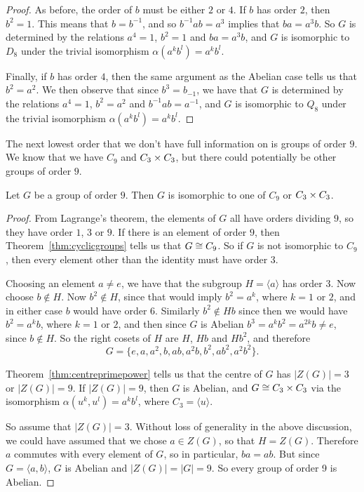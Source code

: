 \begin{proof}
  As before, the order of $b$ must be either $2$ or $4$.  If $b$ has order $2$,
  then $b^{2} = 1$.  This means that $b = b^{-1}$, and so $b^{-1}ab = a^{3}$
  implies that $ba = a^{3}b$. So $G$ is determined by the relations
  $a^{4} = 1$, $b^{2} = 1$ and $ba = a^{3}b$, and $G$ is isomorphic to $D_{8}$
  under the trivial isomorphism $\alpha(a^{k}b^{l}) = a^{k}b^{l}$.
  
  Finally, if $b$ has order $4$, then the same argument as the Abelian case
  tells us that $b^{2} = a^{2}$.  We then observe that since $b^{3} = b_{-1}$,
  we have that $G$ is determined by the relations $a^{4} = 1$, $b^{2} = a^{2}$
  and $b^{-1}ab = a^{-1}$, and $G$ is isomorphic to $Q_{8}$
  under the trivial isomorphism $\alpha(a^{k}b^{l}) = a^{k}b^{l}$.
\end{proof}

The next lowest order that we don't have full information on is groups of
order $9$.  We know that we have $C_{9}$ and $C_{3} \times C_{3}$, but there
could potentially be other groups of order $9$.

\begin{theorem}\label{thm:groupsoforder9}
  Let $G$ be a group of order $9$.  Then $G$ is isomorphic to one of $C_{9}$
  or $C_{3} \times C_{3}$.
\end{theorem}
\begin{proof}
  From Lagrange's theorem, the elements of $G$ all have orders dividing $9$,
  so they have order $1$, $3$ or $9$.  If there is an element of order $9$,
  then Theorem~\ref{thm:cyclicgroups} tells us that $G \cong C_{9}$.  So if
  $G$ is not isomorphic to $C_{9}$, then every
  element other than the identity must have order $3$.
  
  Choosing an element $a \ne e$, we have that the subgroup $H = \langle
  a \rangle$ has order $3$.  Now choose $b \not\in H$.  Now $b^{2} \not\in H$,
  since that would imply $b^{2} = a^{k}$, where $k = 1$ or $2$, and in either
  case $b$ would have order $6$.  Similarly $b^{2} \notin Hb$ since then we
  would have $b^{2} = a^{k}b$, where $k = 1$ or $2$, and then since $G$ is
  Abelian $b^{3} = a^{k}b^{2} = a^{2k}b \ne e$, since $b \notin H$.  So the
  right cosets of $H$ are $H$, $Hb$ and $Hb^{2}$, and therefore
  \[
    G = \{e, a, a^{2}, b, ab, a^{2}b, b^{2}, ab^{2}, a^{2}b^{2}\}.
  \]

  Theorem~\ref{thm:centreprimepower} tells us that the centre of $G$ has
  $|Z(G)| = 3$ or $|Z(G)| = 9$.  If $|Z(G)| = 9$, then $G$ is Abelian, and
  $G \cong C_{3} \times C_{3}$ via the isomorphism $\alpha(u^{k}, u^{l}) =
  a^{k}b^{l}$, where $C_{3} = \langle u \rangle$.
  
  So assume that $|Z(G)| = 3$.  Without loss of generality in the above
  discussion, we could have assumed that we chose $a \in Z(G)$, so that
  $H = Z(G)$.  Therefore $a$ commutes with every element of $G$, so in
  particular, $ba = ab$.  But since $G = \langle a, b \rangle$, $G$ is Abelian
  and $|Z(G)| = |G| = 9$.  So every group of order 9 is Abelian.
\end{proof}

